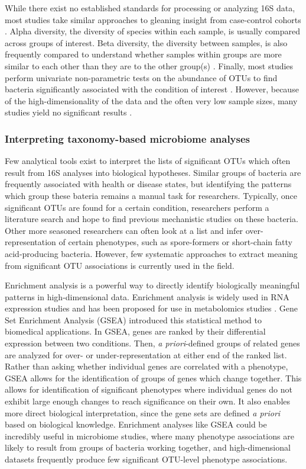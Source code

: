 \documentclass[12pt]{article}
\begin{document}
While there exist no established standards for processing or analyzing 
16S data, most studies take similar approaches to gleaning insight 
from case-control cohorts \cite{knights-supervised-2010}. 
 Alpha diversity, the diversity of species within each sample, is usually compared across groups of interest. 
Beta diversity, the diversity between samples, is also frequently compared to understand whether 
samples within groups are more similar to each 
other than they are to the other group(s) \cite{knights-supervised-2010}. Finally, most studies perform 
univariate non-parametric tests on the abundance of OTUs to find 
bacteria significantly associated with the condition of interest \cite{wang-pval_method-2016}. 
However, because of the high-dimensionality of the data and the 
often very low sample sizes, many studies yield no significant
results \cite{wang-pval_method-2016}.

\subsubsection{Interpreting taxonomy-based microbiome analyses}\label{sec:gsea}
Few analytical tools exist to interpret the lists of
significant OTUs which often result from 16S analyses into biological hypotheses. 
Similar groups of bacteria are frequently associated with health or 
disease states, but identifying the patterns which group these bateria 
remains a manual task for researchers. 
Typically, once significant OTUs are found for a certain condition,
researchers perform a literature search and hope to find 
previous mechanistic studies on these bacteria.
Other more seasoned researchers can often look at a list and infer
over-representation of certain phenotypes, such as spore-formers
or short-chain fatty acid-producing bacteria. However,
few systematic approaches to extract meaning from significant
OTU associations is currently used in the field.

Enrichment analysis is a powerful way to directly identify biologically 
meaningful patterns in high-dimensional data. Enrichment analysis is 
widely used in RNA expression studies and has been proposed for use in 
metabolomics studies \cite{subramanian-gsea-2005, xia-msea-2010}. 
Gene Set Enrichment Analysis (GSEA) introduced
this statistical method to biomedical applications. In GSEA, genes are 
ranked by their differential expression between two conditions. Then, 
\textit{a priori}-defined groups of related genes are analyzed for 
over- or under-representation at either end of the ranked list. Rather 
than asking whether individual genes are correlated with a phenotype, 
GSEA allows for the identification of groups of genes which change 
together. This allows for identification of significant phenotypes 
where individual genes do not exhibit large enough changes to reach 
significance on their own. It also enables more direct biological 
interpretation, since the gene sets are defined \textit{a priori} 
based on biological knowledge. Enrichment analyses like GSEA
could be incredibly useful in microbiome studies, where 
many phenotype associations are likely to result from groups of
bacteria working together, and high-dimensional datasets
frequently produce few significant OTU-level phenotype associations.
\end{document}
